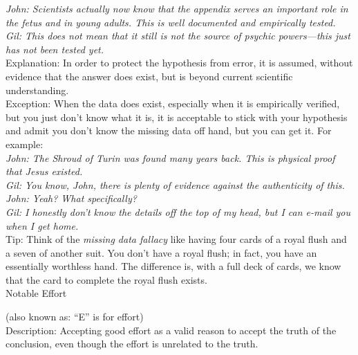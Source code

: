\documentclass[a4paper,12pt,single,pdftex]{scrartcl}
\begin{document}
    
      {\em John: Scientists actually now know that the appendix serves an important role in the fetus and in young adults.  This is well documented and empirically tested.}
    \\

    
      {\em Gil: This does not mean that it still is not the source of psychic powers—this just has not been tested yet.}
    \\

    
      Explanation: In order to protect the hypothesis from error, it is assumed, without evidence that the answer does exist, but is beyond current scientific understanding. 
    \\

    
      Exception: When the data does exist, especially when it is empirically verified, but you just don't know what it is, it is acceptable to stick with your hypothesis and admit you don’t know the missing data off hand, but you can get it.  For example:
    \\

    
      {\em John: The Shroud of Turin was found many years back.  This is physical proof that Jesus existed.}
    \\

    
      {\em Gil: You know, John, there is plenty of evidence against the authenticity of this.}
    \\

    
      {\em John: Yeah? What specifically?}
    \\

    
      {\em Gil: I honestly don’t know the details off the top of my head, but I can e-mail you when I get home.}
    \\

    
      Tip: Think of the {\em missing data fallacy} like having four cards of a royal flush and a seven of another suit. You don’t have a royal flush; in fact, you have an essentially worthless hand. The difference is, with a full deck of cards, we know that the card to complete the royal flush exists.
    \\

  

Notable Effort
    
      (also known as: “E” is for effort)
    \\

  
    Description: Accepting good effort as a valid reason to accept the truth of the conclusion, even though the effort is unrelated to the truth.
\end{document}
